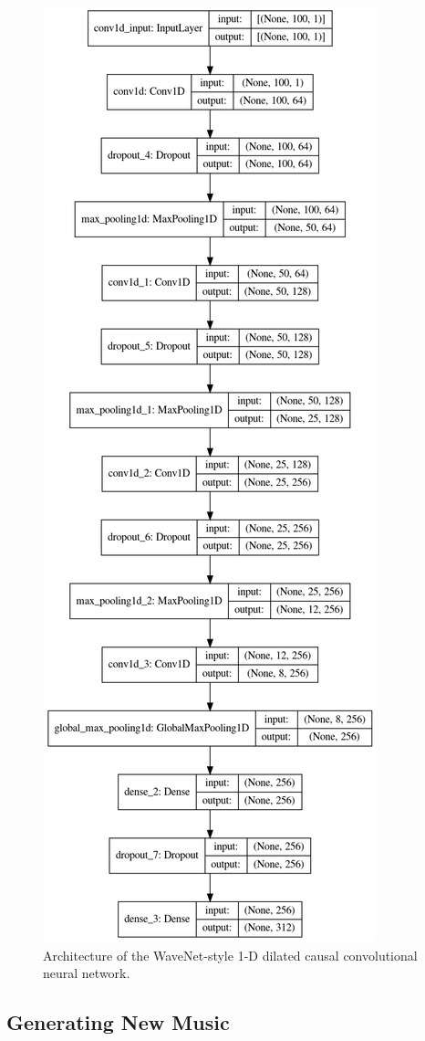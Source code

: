 \documentclass[sigconf,authorversion]{acmart}
\begin{document}
\begin{figure}[h]
  \centering
  \includegraphics[width=0.6\linewidth]{wavenet_model.png}
  \caption{Architecture of the WaveNet-style 1-D dilated causal convolutional neural network.}
  \label{wavenet_model}
\end{figure}

\subsection{Generating New Music}
\end{document}
